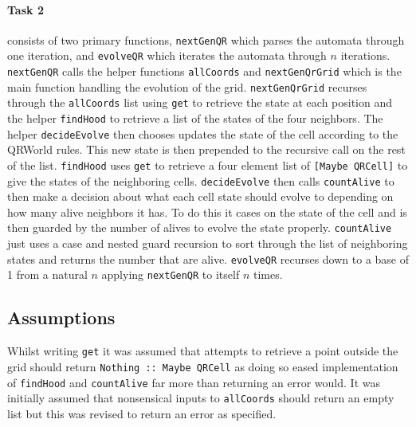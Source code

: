 \documentclass[11pt]{article}
\begin{document}
\paragraph{Task 2} consists of two primary functions, \verb|nextGenQR| which parses the automata through one iteration, and \verb|evolveQR| which iterates the automata through $n$ iterations. \verb|nextGenQR| calls the helper functions \verb|allCoords| and \verb|nextGenQrGrid| which is the main function handling the evolution of the grid.
\verb|nextGenQrGrid| recurses through the \verb|allCoords| list using \verb|get| to retrieve the state at each position and the helper \verb|findHood| to retrieve a list of the states of the four neighbors. The helper \verb|decideEvolve| then chooses updates the state of the cell according to the QRWorld rules. This new state is then prepended to the recursive call on the rest of the list.
\verb|findHood| uses \verb|get| to retrieve a four element list of \verb|[Maybe QRCell]| to give the states of the neighboring cells. \verb|decideEvolve| then calls \verb|countAlive| to then make a decision about what each cell state should evolve to depending on how many alive neighbors it has. To do this it cases on the state of the cell and is then guarded by the number of alives to evolve the state properly. \verb|countAlive| just uses a case and nested guard recursion to sort through the list of neighboring states and returns the number that are alive. \verb|evolveQR| recurses down to a base of 1 from a natural $n$ applying \verb|nextGenQR| to itself $n$ times.




 \subsection{Assumptions}%
Whilst writing \verb|get| it was assumed that attempts to retrieve a point outside the grid should return \verb|Nothing :: Maybe QRCell| as doing so eased implementation of \verb|findHood| and \verb|countAlive| far more than returning an error would. It was initially assumed that nonsensical inputs to \verb|allCoords| should return an empty list but this was revised to return an error as specified.
\end{document}
